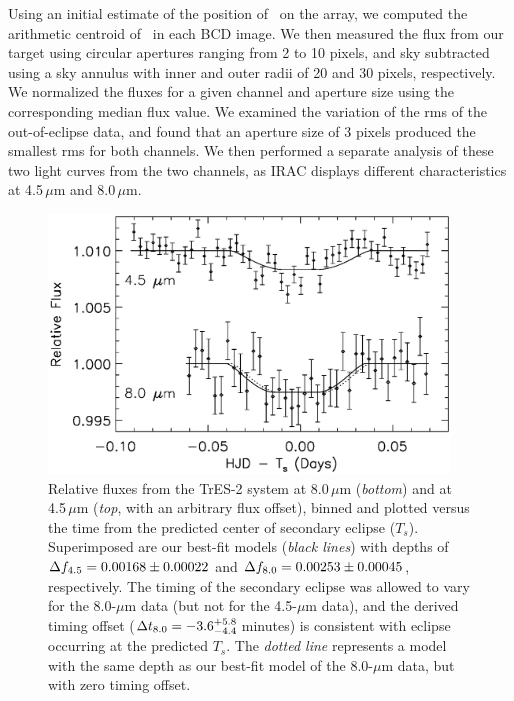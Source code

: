 Using an initial estimate of the position of \tresTwo\ on the array, we computed the arithmetic centroid of \tresTwo\ in each BCD image.
We then measured the flux from our target using circular apertures ranging from 2 to 10 pixels, and sky subtracted using a sky annulus with inner and outer radii of 20 and 30 pixels, respectively.
We normalized the fluxes for a given channel and aperture size using the corresponding median flux value.
We examined the variation of the rms of the out-of-eclipse data, and found that an aperture size of 3 pixels produced the smallest rms for both channels.
We then performed a separate analysis of these two light curves from the two channels, as IRAC displays different characteristics at 4.5\,$\mu$m and 8.0\,$\mu$m.

\begin{figure}
\begin{center}
\includegraphics[width=0.95\textwidth]{6_f1}
\caption[%
Near-infrared relative fluxes from TrES-2 from {\it Spitzer} observations]{%
Relative fluxes from the TrES-2 system at 8.0\,$\mu$m ({\it bottom}) and at 4.5\,$\mu$m ({\it top}, with an arbitrary flux offset), binned and plotted versus the time from the predicted center of secondary eclipse ($T_{s}$).
Superimposed are our best-fit models (\emph{black lines}) with depths of \mbox{$\Delta f_{\rm {4.5}} = 0.00168 \pm 0.00022$} and \mbox{$\Delta f_{\rm {8.0}} = 0.00253 \pm 0.00045$}, respectively.
The timing of the secondary eclipse was allowed to vary for the 8.0-$\mu$m data (but not for the 4.5-$\mu$m data), and the derived timing offset (\mbox{$\Delta t_{\rm {8.0}} = -3.6^{+5.8}_{-4.4}$\,minutes}) is consistent with eclipse occurring at the predicted $T_{s}$.
The \emph{dotted line} represents a model with the same depth as our best-fit model of the 8.0-$\mu$m data, but with zero timing offset.%
}
\label{cha:spitzer:fig:tres2_combplot}
\end{center}
\end{figure}

